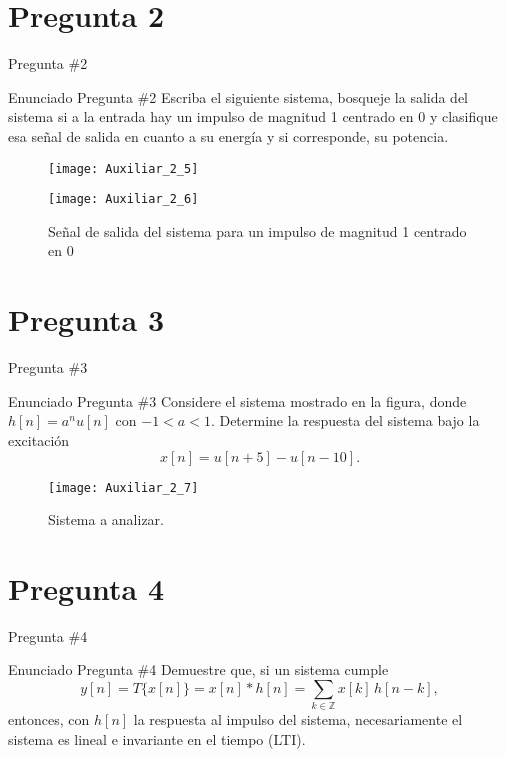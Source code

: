 \documentclass[
    10pt,
    aspectratio=169,
    xcolor={dvipsnames},
    spanish,
    ]{beamer}
\begin{document}
\section{Pregunta 2}
\begin{frame}{Pregunta \#2}
\begin{block}{Enunciado Pregunta \#2}
 Escriba el siguiente sistema, bosqueje la salida del sistema si a la entrada hay un impulso de magnitud 1 centrado en 0 y clasifique esa señal de salida en cuanto a su energía y si corresponde, su potencia.
\end{block}
\begin{figure}[H]
  \centering
  \texttt{[image: Auxiliar\_2\_5]}
\end{figure}
\end{frame}
\begin{frame}
\begin{figure}
  \texttt{[image: Auxiliar\_2\_6]}
  \caption{Señal de salida del sistema para un impulso de magnitud 1 centrado en 0}
\end{figure}
\end{frame}
\section{Pregunta 3}
\begin{frame}{Pregunta \#3}
\begin{block}{Enunciado Pregunta \#3}
Considere el sistema mostrado en la figura, donde \(h[n]=a^n u[n]\) con \(-1<a<1\). Determine la respuesta del sistema bajo la excitación
\[x[n]=u[n+5]-u[n-10].\]
\end{block}
\begin{figure}[H]
  \centering
  \texttt{[image: Auxiliar\_2\_7]}
  \caption{Sistema a analizar.}
\end{figure}
\end{frame}
\section{Pregunta 4}
\begin{frame}{Pregunta \#4}
\begin{block}{Enunciado Pregunta \#4}
Demuestre que, si un sistema cumple
\[ y[n]=T\{x[n]\}=x[n]*h[n]=\sum_{k\in\mathbb{Z}} x[k] \, h[n-k], \]
entonces, con \(h[n]\) la respuesta al impulso del sistema, necesariamente el sistema es lineal e invariante en el tiempo (LTI).
\end{block}
\end{frame}
\end{document}
